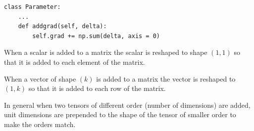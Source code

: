 {{\begin{verbatim}
class Parameter:
    ...
    def addgrad(self, delta):
        self.grad += np.sum(delta, axis = 0)
\end{verbatim}


When a scalar is added to a matrix the scalar is reshaped to shape $(1,1)$ so that it is added to each element of the matrix.

\vfill
When a vector of shape $(k)$ is added to a matrix the vector is reshaped to $(1,k)$ so that it is added to each row of the matrix.

\vfill
In general when two tensors of different order (number of dimensions) are added, unit dimensions are prepended to the shape of the tensor of smaller order
to make the orders match.
}

}


